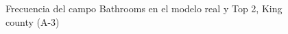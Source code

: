 \begin{figure}[H]
    \centering
    
    \caption{Frecuencia del campo Bathrooms en el modelo real y Top 2, King county (A-3)}
    \label{frecuency-top2-bathrooms}
\end{figure}